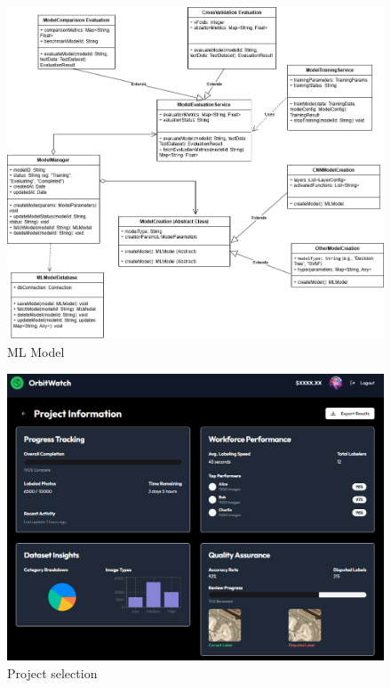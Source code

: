 \documentclass[12pt, titlepage]{article}
\begin{document}
    \begin{figure}[H]
    \centering
    \includegraphics[width=1\textwidth]{Analysis_Class_Diagram_Model.png}
    \caption{ML Model}
    \label{FigUH}
    \end{figure}

    \begin{figure}[H]
    \centering
    \includegraphics[width=1\textwidth]{project_stats.png}
    \caption{Project selection}
    \label{FigUH}
    \end{figure}
\end{document}
